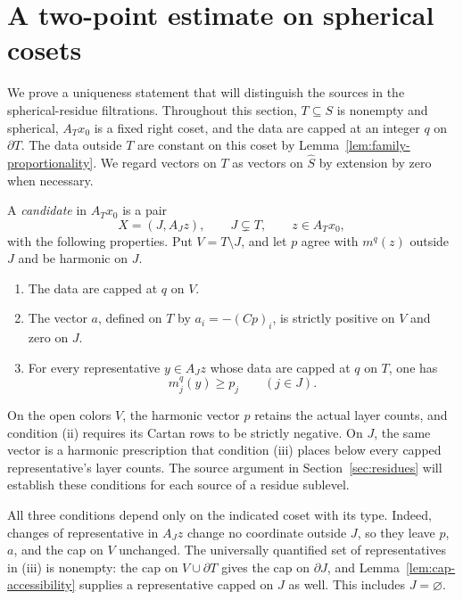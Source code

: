\section{A two-point estimate on spherical cosets}
\label{sec:two-point}

We prove a uniqueness statement that will distinguish the sources in the
spherical-residue filtrations.  Throughout this section, \(T\subseteq S\)
is nonempty and spherical, \(A_Tx_0\) is a fixed right coset, and the
data are capped at an integer \(q\) on \(\partial T\).  The data outside
\(T\) are constant on this coset by
Lemma~\ref{lem:family-proportionality}.  We regard vectors on \(T\) as
vectors on \(\widehat S\) by extension by zero when necessary.

\begin{definition}
\label{def:two-point-candidate}
A \emph{candidate} in \(A_Tx_0\) is a pair
\[
 X=(J,A_Jz),\qquad J\subsetneq T,\qquad z\in A_Tx_0,
\]
with the following properties.  Put \(V=T\setminus J\), and let \(p\)
agree with \(m^q(z)\) outside \(J\) and be harmonic on \(J\).
\begin{enumerate}[label=\textup{(\roman*)}]
\item The data are capped at \(q\) on \(V\).
\item The vector \(a\), defined on \(T\) by
      \(a_i=-(Cp)_i\), is strictly positive on \(V\) and zero on \(J\).
\item For every representative \(y\in A_Jz\) whose data are capped at
      \(q\) on \(T\), one has
      \[
      m_j^q(y)\ge p_j\qquad(j\in J).
      \]
\end{enumerate}
\end{definition}

On the open colors \(V\), the harmonic vector \(p\) retains the actual
layer counts, and condition \textup{(ii)} requires its Cartan rows to be
strictly negative.  On \(J\), the same vector is a harmonic prescription
that condition \textup{(iii)} places below every capped representative's
layer counts.  The source argument in Section~\ref{sec:residues} will
establish these conditions for each source of a residue sublevel.

All three conditions depend only on the indicated coset with its type.
Indeed, changes of representative in \(A_Jz\) change no coordinate
outside \(J\), so they leave \(p\), \(a\), and the cap on \(V\)
unchanged.  The universally quantified set of representatives in
\textup{(iii)} is nonempty: the cap on
\(V\cup\partial T\) gives the cap on \(\partial J\), and
Lemma~\ref{lem:cap-accessibility} supplies a representative capped on
\(J\) as well.  This includes \(J=\varnothing\).


